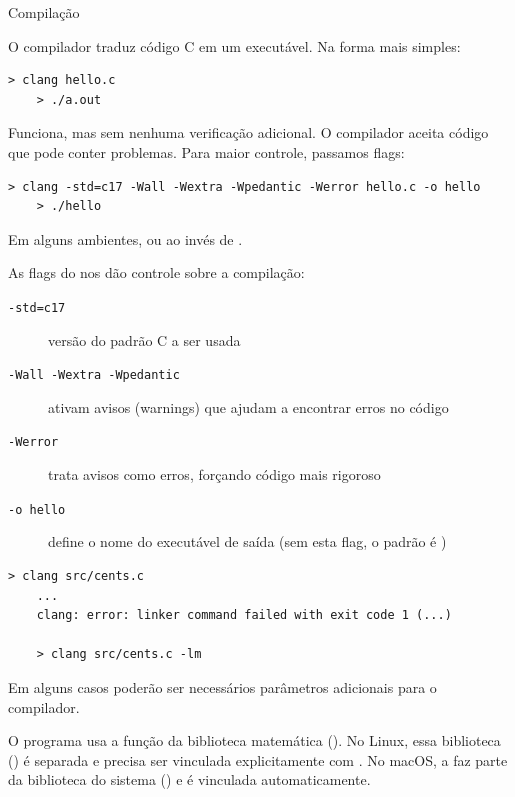 \documentclass{beamer}
\begin{document}
\begin{frame}{Compilação}

  O compilador  traduz código C em um executável. Na
  forma mais simples:

  \begin{lstlisting}[style=normalbash]
    > clang hello.c
    > ./a.out
  \end{lstlisting}

  Funciona, mas sem nenhuma verificação adicional. O compilador aceita
  código que pode conter problemas. Para maior controle, passamos
  flags:

  \begin{lstlisting}[style=normalbash]
    > clang -std=c17 -Wall -Wextra -Wpedantic -Werror hello.c -o hello
    > ./hello
  \end{lstlisting}

  Em alguns ambientes,  ou  ao invés de
  .

  \framebreak

  As flags do  nos dão controle sobre a compilação:

  \begin{description}
  \item[\texttt{-std=c17}] versão do padrão C a ser usada
  \item[\texttt{-Wall -Wextra -Wpedantic}] ativam avisos (warnings)
    que ajudam a encontrar erros no código
  \item[\texttt{-Werror}] trata avisos como erros, forçando código
    mais rigoroso
  \item[\texttt{-o hello}] define o nome do executável de saída (sem
    esta flag, o padrão é )
  \end{description}

  \framebreak

  \begin{lstlisting}[style=code]
    > clang src/cents.c
    ...
    clang: error: linker command failed with exit code 1 (...)

    > clang src/cents.c -lm
  \end{lstlisting}

  Em alguns casos poderão ser necessários parâmetros adicionais para o
  compilador.

  O programa usa a função  da biblioteca matemática
  (). No Linux, essa biblioteca () é
  separada e precisa ser vinculada explicitamente com . No
  macOS, a  faz parte da biblioteca do sistema
  () e é vinculada automaticamente.


\end{frame}
\end{document}

